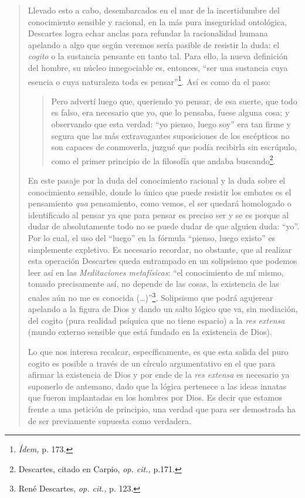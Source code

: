 \begin{quote}
Llevado esto a cabo, desembarcados en el mar de la incertidumbre del conocimiento sensible y racional, en la más pura inseguridad ontológica, Descartes logra echar anclas para refundar la racionalidad humana apelando a algo que según veremos sería pasible de resistir la duda: el \emph{cogito} o la sustancia pensante en tanto tal. Para ello, la nueva definición del hombre, su núcleo innegociable es, entonces, \enquote{ser una sustancia cuya esencia o cuya naturaleza toda es pensar}\footnote{\emph{Ídem,} p. 173.}. Así es como da el paso:

\begin{quote}
Pero advertí luego que, queriendo yo pensar, de esa suerte, que todo es falso, era necesario que yo, que lo pensaba, fuese alguna cosa; y observando que esta verdad: \enquote{yo pienso, luego soy} era tan firme y segura que las más extravagantes suposiciones de los escépticos no son capaces de conmoverla, juzgué que podía recibirla sin escrúpulo, como el primer principio de la filosofía que andaba buscando\footnote{Descartes, citado en Carpio, \emph{op. cit.,} p.171.}.
\end{quote}

En este pasaje por la duda del conocimiento racional y la duda sobre el conocimiento sensible, donde lo único que puede resistir los embates es el pensamiento \emph{qua} pensamiento, como vemos, el ser quedará homologado o identificado al pensar ya que para pensar es preciso ser y se es porque al dudar de absolutamente todo no se puede dudar de que alguien duda: \enquote{yo}. Por lo cual, el uso del \enquote{luego} en la fórmula \enquote{pienso, luego existo} es simplemente expletivo. Es necesario recordar, no obstante, que al realizar esta operación Descartes queda entrampado en un solipsismo que podemos leer así en las \emph{Meditaciones metafísicas}: \enquote{el conocimiento de mí mismo, tomado precisamente así, no depende de las cosas, la existencia de las cuales aún no me es conocida (\dots)}\footnote{René Descartes, \emph{op. cit.,} p. 123.}. Solipsismo que podrá agujerear apelando a la figura de Dios y dando un salto lógico que va, sin mediación, del cogito (pura realidad psíquica que no tiene espacio) a la \emph{res extensa} (mundo externo sensible que está fundado en la existencia de Dios).

Lo que nos interesa recalcar, específicamente, es que esta salida del puro cogito es posible a través de un círculo argumentativo en el que para afirmar la existencia de Dios y por ende de la \emph{res extensa} es necesario ya suponerlo de antemano, dado que la lógica  pertenece a las ideas innatas que fueron implantadas en los hombres por Dios. Es decir que estamos frente a una petición de principio, una verdad que para ser demostrada ha de ser previamente supuesta como verdadera.


\end{quote}
